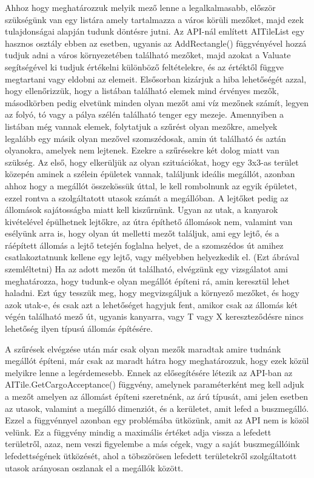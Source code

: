 Ahhoz hogy meghatározzuk melyik mező lenne a legalkalmasabb, először szükségünk van egy listára amely tartalmazza a város körüli mezőket, majd ezek tulajdonságai alapján tudunk döntésre jutni. Az API-nál említett AITileList egy hasznos osztály ebben az esetben, ugyanis az AddRectangle() függvényével hozzá tudjuk adni a város környezetében található mezőket, majd azokat a Valuate segítségével ki tudjuk értékelni különböző feltételekre, és az értéktől függve megtartani vagy eldobni az elemeit. Elsősorban kizárjuk a hiba lehetőségét azzal, hogy ellenőrizzük, hogy a listában található elemek mind érvényes mezők, másodkörben pedig elvetünk minden olyan mezőt ami víz mezőnek számít, legyen az folyó, tó vagy a pálya szélén található tenger egy mezeje.
Amennyiben a listában még vannak elemek, folytatjuk a szűrést olyan mezőkre, amelyek legalább egy másik olyan mezővel szomszédosak, amin út található és aztán olyanokra, amelyek nem lejtenek. Ezekre a szűrésekre két dolog miatt van szükség. Az első, hogy elkerüljük az olyan szituációkat, hogy egy 3x3-as terület közepén aminek a szélein épületek vannak, találjunk ideális megállót, azonban ahhoz hogy a megállót összekössük úttal, le kell rombolnunk az egyik épületet, ezzel rontva a szolgáltatott utasok számát a megállóban. A lejtőket pedig az állomások sajátosságba miatt kell kiszűrnünk. Ugyan az utak, a kanyarok kivételével épülhetnek lejtőkre, az útra építhető állomások nem, valamint van esélyünk arra is, hogy olyan út melletti mezőt találjuk, ami egy lejtő, és a ráépített állomás a lejtő tetején foglalna helyet, de a szomszédos út amihez csatlakoztatnunk kellene egy lejtő, vagy mélyebben helyezkedik el. (Ezt ábrával szemléltetni) Ha az adott mezőn út található, elvégzünk egy vizsgálatot ami meghatározza, hogy tudunk-e olyan megállót építeni rá, amin keresztül lehet haladni. Ezt úgy tesszük meg, hogy megvizsgáljuk a környező mezőket, és hogy azok utak-e, és csak azt a lehetőséget hagyjuk fent, amikor csak az állomás két végén található mező út, ugyanis kanyarra, vagy T vagy X kereszteződésre nincs lehetőség ilyen típusú állomás építésére.

A szűrések elvégzése után már csak olyan mezők maradtak amire tudnánk megállót építeni, már csak az maradt hátra hogy meghatározzuk, hogy ezek közül melyikre lenne a legérdemesebb. Ennek az elősegítésére létezik az API-ban az AITile.GetCargoAcceptance() függvény, amelynek paraméterként meg kell adjuk a mezőt amelyen az állomást építeni szeretnénk, az árú típusát, ami jelen esetben az utasok, valamint a megálló dimenziót, és a kerületet, amit lefed a buszmegálló. Ezzel a függvénnyel azonban egy problémába ütközünk, amit az API nem is közöl velünk. Ez a függvény mindig a maximális értéket adja vissza a lefedett területről, azaz, nem veszi figyelembe a más cégek, vagy a saját buszmegállóink lefedettségének ütközését, ahol a töbszörösen lefedett területekről szolgáltatott utasok arányosan oszlanak el a megállók között.

